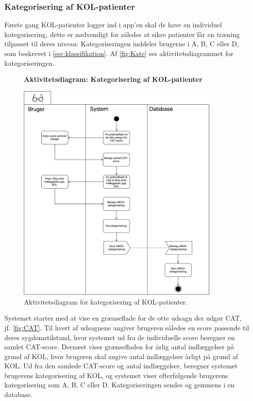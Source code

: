 \subsubsection*{Kategorisering af KOL-patienter} \label{sec:kategorisering}
Første gang KOL-patienter logger ind i app'en skal de have en individuel kategorisering, dette er nødvendigt for således at sikre patienter får en træning tilpasset til deres niveau. 
Kategoriseringen inddeler brugerne i A, B, C eller D, som beskrevet i \autoref{sec:klassifikation}. Af \autoref{fig:Kate} ses aktivitetsdiagrammet for kategoriseringen.

\begin{figure} [H]
\centering
\textbf{Aktivitetsdiagram: Kategorisering af KOL-patienter}\par\medskip
\includegraphics[width=0.9\textwidth]{figures/aktivitetsdiagram/Kategorisering}
\caption{Aktivitetsdiagram for kategorisering af KOL-patienter.}
\label{fig:Kate}
\end{figure}

\noindent
Systemet starter med at vise en grænseflade for de otte udsagn der udgør CAT, jf. \autoref{fig:CAT}. Til hvert af udsagnene angiver brugeren således en score passende til deres sygdomstilstand, hvor systemet ud fra de individuelle score beregner en samlet CAT-score. 
Dernæst vises grænsefladen for årlig antal indlæggelser på grund af KOL, hvor brugeren skal angive antal indlæggelser årligt på grund af KOL. Ud fra den samlede CAT-score og antal indlæggelser, beregner systemet brugerens kategorisering af KOL, og systemet viser efterfølgende brugerens kategorisering som  A, B, C eller D.
Kategoriseringen sendes og gemmens i en database. 